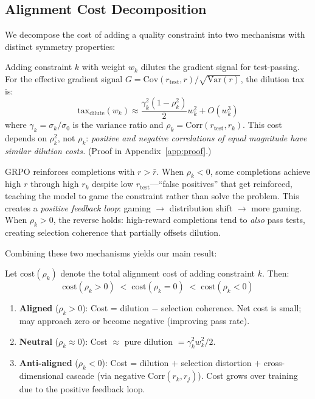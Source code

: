 \documentclass{article}
\newcommand{\Cov}{\mathrm{Cov}}
\newcommand{\Var}{\mathrm{Var}}
\newcommand{\Corr}{\mathrm{Corr}}
\begin{document}
\subsection{Alignment Cost Decomposition}

We decompose the cost of adding a quality constraint into two mechanisms with distinct symmetry properties:

\begin{proposition}
\label{prop:dilution}
Adding constraint $k$ with weight $w_k$ dilutes the gradient signal for test-passing. For the effective gradient signal $G = \Cov(r_{\text{test}}, r) / \sqrt{\Var(r)}$, the dilution tax is:
\begin{equation}
    \mathrm{tax}_{\mathrm{dilute}}(w_k) \approx \frac{\gamma_k^2(1 - \rho_k^2)}{2} w_k^2 + O(w_k^3)
    \label{eq:dilution}
\end{equation}
where $\gamma_k = \sigma_k / \sigma_0$ is the variance ratio and $\rho_k = \Corr(r_{\text{test}}, r_k)$. This cost depends on $\rho_k^2$, not $\rho_k$: \emph{positive and negative correlations of equal magnitude have similar dilution costs.} (Proof in Appendix~\ref{app:proof}.)
\end{proposition}

\begin{proposition}
\label{prop:selection}
GRPO reinforces completions with $r > \bar{r}$. When $\rho_k < 0$, some completions achieve high $r$ through high $r_k$ despite low $r_{\text{test}}$---``false positives'' that get reinforced, teaching the model to game the constraint rather than solve the problem. This creates a \emph{positive feedback loop}: gaming $\to$ distribution shift $\to$ more gaming. When $\rho_k > 0$, the reverse holds: high-reward completions tend to \emph{also} pass tests, creating selection coherence that partially offsets dilution.
\end{proposition}

Combining these two mechanisms yields our main result:

\begin{theorem}
\label{thm:hierarchy}
Let $\mathrm{cost}(\rho_k)$ denote the total alignment cost of adding constraint $k$. Then:
\begin{equation}
    \mathrm{cost}(\rho_k > 0) \;<\; \mathrm{cost}(\rho_k = 0) \;<\; \mathrm{cost}(\rho_k < 0)
\end{equation}
\begin{enumerate}
    \item \textbf{Aligned} ($\rho_k > 0$): Cost = dilution $-$ selection coherence. Net cost is small; may approach zero or become negative (improving pass rate).
    \item \textbf{Neutral} ($\rho_k \approx 0$): Cost $\approx$ pure dilution $ = \gamma_k^2 w_k^2 / 2$.
    \item \textbf{Anti-aligned} ($\rho_k < 0$): Cost = dilution $+$ selection distortion $+$ cross-dimensional cascade (via negative $\Corr(r_k, r_j)$). Cost grows over training due to the positive feedback loop.
\end{enumerate}
\end{theorem}
\end{document}
